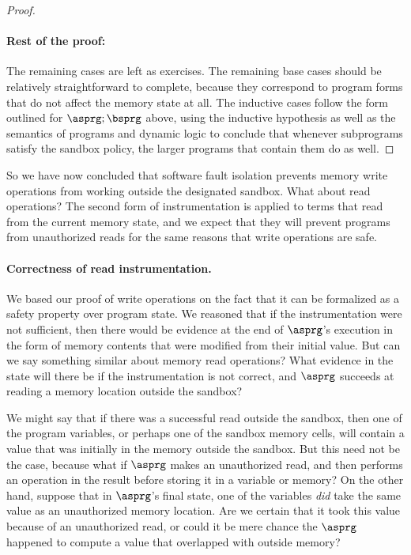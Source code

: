 \documentclass[11pt,twoside]{scrartcl}
\begin{document}
\begin{proof}
\paragraph{Rest of the proof:}
The remaining cases are left as exercises. The remaining base cases should be relatively straightforward to complete, because they correspond to program forms that do not affect the memory state at all. The inductive cases follow the form outlined for $\asprg;\bsprg$ above, using the inductive hypothesis as well as the semantics of programs and dynamic logic to conclude that whenever subprograms satisfy the sandbox policy, the larger programs that contain them do as well.
\end{proof}
So we have now concluded that software fault isolation prevents memory write operations from working outside the designated sandbox. What about read operations? The second form of instrumentation is applied to terms that read from the current memory state, and we expect that they will prevent programs from unauthorized reads for the same reasons that write operations are safe.

\paragraph{Correctness of read instrumentation.}
We based our proof of write operations on the fact that it can be formalized as a safety property over program state. We reasoned that if the instrumentation were not sufficient, then there would be evidence at the end of $\asprg$'s execution in the form of memory contents that were modified from their initial value. But can we say something similar about memory read operations? What evidence in the state will there be if the instrumentation is not correct, and $\asprg$ succeeds at reading a memory location outside the sandbox?

We might say that if there was a successful read outside the sandbox, then one of the program variables, or perhaps one of the sandbox memory cells, will contain a value that was initially in the memory outside the sandbox. But this need not be the case, because what if $\asprg$ makes an unauthorized read, and then performs an operation in the result before storing it in a variable or memory? On the other hand, suppose that in $\asprg$'s final state, one of the variables \emph{did} take the same value as an unauthorized memory location. Are we certain that it took this value because of an unauthorized read, or could it be mere chance the $\asprg$ happened to compute a value that overlapped with outside memory?
\end{document}
